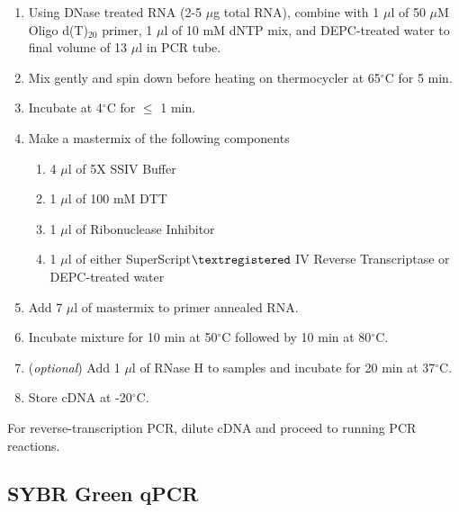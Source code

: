 \begin{enumerate}
\item Using DNase treated RNA (2-5 $\mu$g total RNA), combine with 1 $\mu$l of 50 $\mu$M Oligo d(T)$_{20}$ primer, 1 $\mu$l of 10 mM dNTP mix, and DEPC-treated water to final volume of 13 $\mu$l in PCR tube.
\item Mix gently and spin down before heating on thermocycler at 65$^{\circ}$C for 5 min.
\item Incubate at 4$^{\circ}$C for $\le$ 1 min.
\item Make a mastermix of the following components
  \begin{enumerate}
  \item 4 $\mu$l of 5X SSIV Buffer
  \item 1 $\mu$l of 100 mM DTT
  \item 1 $\mu$l of Ribonuclease Inhibitor
  \item 1 $\mu$l of either SuperScript$\textregistered$ IV Reverse Transcriptase or DEPC-treated water
  \end{enumerate}
\item Add 7 $\mu$l of mastermix to primer annealed RNA.
\item Incubate mixture for 10 min at 50$^{\circ}$C followed by 10 min at 80$^{\circ}$C.
\item (\textit{optional}) Add 1 $\mu$l of RNase H to samples and incubate for 20 min at 37$^{\circ}$C.
\item Store cDNA at -20$^{\circ}$C.
\end{enumerate}

\noindent For reverse-transcription PCR, dilute cDNA and proceed to running PCR reactions.

\subsection{SYBR Green qPCR}

